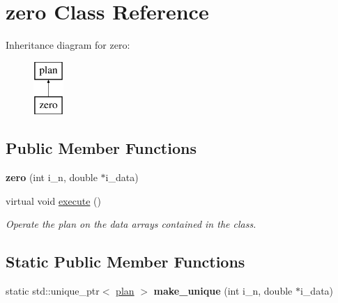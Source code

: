 \hypertarget{classzero}{\section{zero Class Reference}
\label{classzero}
}
Inheritance diagram for zero\-:\begin{figure}[H]
\begin{center}
\leavevmode
\includegraphics[height=2.000000cm]{classzero}
\end{center}
\end{figure}
\subsection*{Public Member Functions}
\begin{DoxyCompactItemize}
\item 
\hypertarget{classzero_a65e96258e2251470f24336c88e198ec2}{{\bfseries zero} (int i\-\_\-n, double $\ast$i\-\_\-data)}\label{classzero_a65e96258e2251470f24336c88e198ec2}

\item 
virtual void \hyperlink{classzero_a5d8c7f5d0f82a404f8ac9d543f355709}{execute} ()
\begin{DoxyCompactList}\small\item\em Operate the plan on the data arrays contained in the class. \end{DoxyCompactList}\end{DoxyCompactItemize}
\subsection*{Static Public Member Functions}
\begin{DoxyCompactItemize}
\item 
\hypertarget{classzero_ab44c1294ef5449437dee4a192e825e77}{static std\-::unique\-\_\-ptr$<$ \hyperlink{classplan}{plan} $>$ {\bfseries make\-\_\-unique} (int i\-\_\-n, double $\ast$i\-\_\-data)}\label{classzero_ab44c1294ef5449437dee4a192e825e77}

\end{DoxyCompactItemize}
